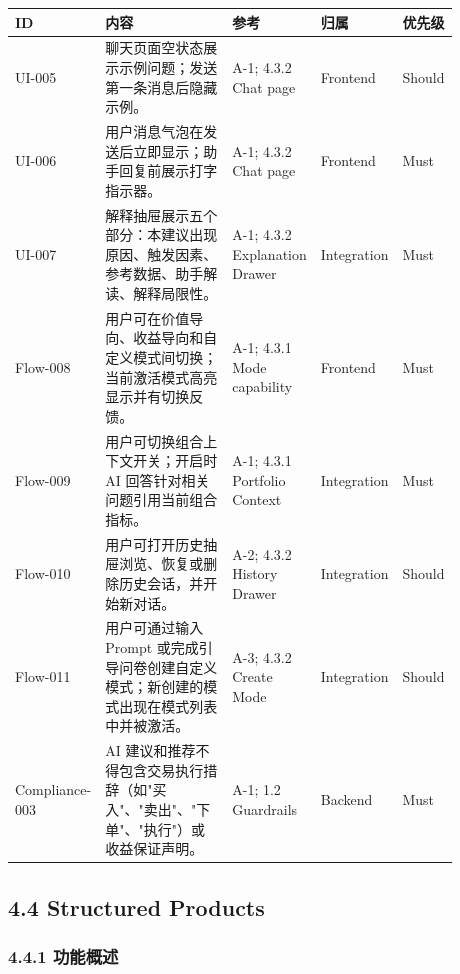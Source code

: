 \begingroup
\small
\begin{longtable}{L{0.18\linewidth}L{0.30\linewidth}L{0.18\linewidth}L{0.12\linewidth}L{0.10\linewidth}}
\toprule
\textbf{ID} & \textbf{内容} & \textbf{参考} & \textbf{归属} & \textbf{优先级} \\
\midrule
UI-005 & 聊天页面空状态展示示例问题；发送第一条消息后隐藏示例。 & A-1; 4.3.2 Chat page & Frontend & Should \\
UI-006 & 用户消息气泡在发送后立即显示；助手回复前展示打字指示器。 & A-1; 4.3.2 Chat page & Frontend & Must \\
UI-007 & 解释抽屉展示五个部分：本建议出现原因、触发因素、参考数据、助手解读、解释局限性。 & A-1; 4.3.2 Explanation Drawer & Integration & Must \\
Flow-008 & 用户可在价值导向、收益导向和自定义模式间切换；当前激活模式高亮显示并有切换反馈。 & A-1; 4.3.1 Mode capability & Frontend & Must \\
Flow-009 & 用户可切换组合上下文开关；开启时 AI 回答针对相关问题引用当前组合指标。 & A-1; 4.3.1 Portfolio Context & Integration & Must \\
Flow-010 & 用户可打开历史抽屉浏览、恢复或删除历史会话，并开始新对话。 & A-2; 4.3.2 History Drawer & Integration & Should \\
Flow-011 & 用户可通过输入 Prompt 或完成引导问卷创建自定义模式；新创建的模式出现在模式列表中并被激活。 & A-3; 4.3.2 Create Mode & Integration & Should \\
Compliance-003 & AI 建议和推荐不得包含交易执行措辞（如"买入"、"卖出"、"下单"、"执行"）或收益保证声明。 & A-1; 1.2 Guardrails & Backend & Must \\
\bottomrule
\end{longtable}
\endgroup

\subsection{4.4 Structured Products}

\subsubsection{4.4.1 功能概述}

